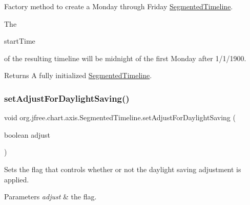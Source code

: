 Factory method to create a Monday through Friday \mbox{\hyperlink{classorg_1_1jfree_1_1chart_1_1axis_1_1_segmented_timeline}{Segmented\+Timeline}}. 

The
\begin{DoxyCode}
startTime 
\end{DoxyCode}
 of the resulting timeline will be midnight of the first Monday after 1/1/1900.

\begin{DoxyReturn}{Returns}
A fully initialized \mbox{\hyperlink{classorg_1_1jfree_1_1chart_1_1axis_1_1_segmented_timeline}{Segmented\+Timeline}}. 
\end{DoxyReturn}
\mbox{\label{classorg_1_1jfree_1_1chart_1_1axis_1_1_segmented_timeline_ad4081bf713881a6a1d1cbbaea0f88136}} 
\subsubsection{\texorpdfstring{set\+Adjust\+For\+Daylight\+Saving()}{setAdjustForDaylightSaving()}}
{\footnotesize\ttfamily void org.\+jfree.\+chart.\+axis.\+Segmented\+Timeline.\+set\+Adjust\+For\+Daylight\+Saving (\begin{DoxyParamCaption}\item[{boolean}]{adjust }\end{DoxyParamCaption})}

Sets the flag that controls whether or not the daylight saving adjustment is applied.


\begin{DoxyParams}{Parameters}
{\em adjust} & the flag. \\
\hline
\end{DoxyParams}
\mbox{\label{classorg_1_1jfree_1_1chart_1_1axis_1_1_segmented_timeline_a2780e1604c8b8eadb55056b2b00b50f8}} 
